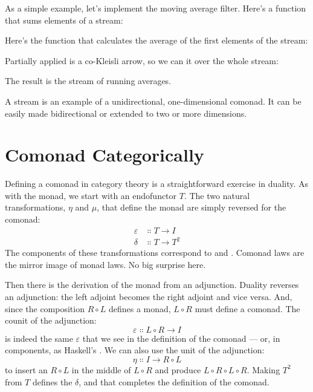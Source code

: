 As a simple example, let's implement the moving average filter. Here's a
function that sums  elements of a stream:

Here's the function that calculates the average of the first 
elements of the stream:

Partially applied  is a co-Kleisli arrow, so we can
 it over the whole stream:

The result is the stream of running averages.

A stream is an example of a unidirectional, one-dimensional comonad. It
can be easily made bidirectional or extended to two or more dimensions.

\section{Comonad Categorically}

Defining a comonad in category theory is a straightforward exercise in
duality. As with the monad, we start with an endofunctor $T$. The
two natural transformations, $\eta$ and $\mu$, that define the monad are simply
reversed for the comonad:
\begin{align*}
  \varepsilon & \Colon T \to I   \\
  \delta      & \Colon T \to T^2
\end{align*}
The components of these transformations correspond to 
and . Comonad laws are the mirror image of monad laws.
No big surprise here.

Then there is the derivation of the monad from an adjunction. Duality
reverses an adjunction: the left adjoint becomes the right adjoint and
vice versa. And, since the composition $R \circ L$ defines a monad,
$L \circ R$ must define a comonad. The counit of the adjunction:
\[\varepsilon \Colon L \circ R \to I\]
is indeed the same $\varepsilon$ that we see in the definition of the comonad ---
or, in components, as Haskell's . We can also use the
unit of the adjunction:
\[\eta \Colon I \to R \circ L\]
to insert an $R \circ L$ in the middle of $L \circ R$ and
produce $L \circ R \circ L \circ R$. Making $T^2$ from $T$
defines the $\delta$, and that completes the definition of the comonad.

